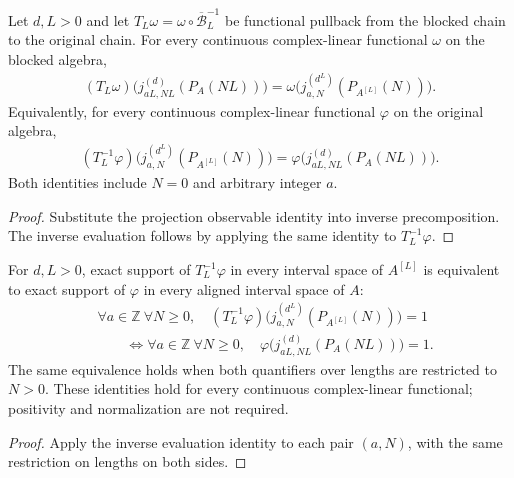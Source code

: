 \begin{lemma}
    \label{thm:blocked_ground_projection_expectation}
    \leanok
    Let $d,L>0$ and let $T_L\omega=\omega\circ\overline{\mathcal B}_L^{-1}$
    be functional pullback from the blocked chain to the original chain.
    For every continuous complex-linear functional $\omega$ on the blocked
    algebra,
    \begin{align}
        (T_L\omega)\bigl(j^{(d)}_{aL,NL}(P_A(NL))\bigr)
        =\omega\bigl(j^{(d^L)}_{a,N}(P_{A^{[L]}}(N))\bigr).
    \end{align}
    Equivalently, for every continuous complex-linear functional $\varphi$
    on the original algebra,
    \begin{align}
        (T_L^{-1}\varphi)\bigl(j^{(d^L)}_{a,N}(P_{A^{[L]}}(N))\bigr)
        =\varphi\bigl(j^{(d)}_{aL,NL}(P_A(NL))\bigr).
    \end{align}
    Both identities include $N=0$ and arbitrary integer $a$.
\end{lemma}
\begin{proof}\leanok
    Substitute the projection observable identity into inverse
    precomposition. The inverse evaluation follows by applying the same
    identity to $T_L^{-1}\varphi$.
\end{proof}

\begin{lemma}
    \label{thm:blocked_ground_projection_support}
    \leanok
    For $d,L>0$, exact support of $T_L^{-1}\varphi$ in every interval
    space of $A^{[L]}$ is equivalent to exact support of $\varphi$ in every
    aligned interval space of $A$:
    \begin{align}
         & \forall a\in\mathbb Z\ \forall N\geq0,\quad
        (T_L^{-1}\varphi)
        \bigl(j^{(d^L)}_{a,N}(P_{A^{[L]}}(N))\bigr)=1
        \\
         & \hspace{2em}\Longleftrightarrow
        \forall a\in\mathbb Z\ \forall N\geq0,\quad
        \varphi\bigl(j^{(d)}_{aL,NL}(P_A(NL))\bigr)=1.
    \end{align}
    The same equivalence holds when both quantifiers over lengths are
    restricted to $N>0$. These identities hold for every continuous
    complex-linear functional; positivity and normalization are not required.
\end{lemma}
\begin{proof}\leanok
    Apply the inverse evaluation identity to each pair $(a,N)$, with the
    same restriction on lengths on both sides.
\end{proof}

